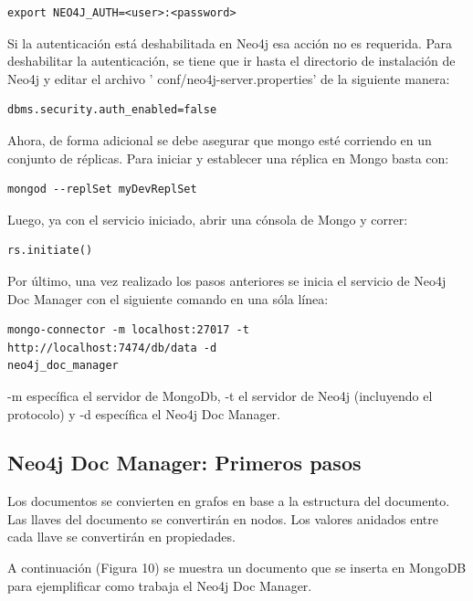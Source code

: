\documentclass[conference]{IEEEtran}
\begin{document}
\begin{lstlisting}
export NEO4J_AUTH=<user>:<password>
\end{lstlisting}

Si la autenticaci\'on est\'a deshabilitada en Neo4j esa acci\'on no es requerida. Para deshabilitar la autenticación, se tiene que ir hasta el directorio de instalaci\'on de Neo4j y editar el archivo ' conf/neo4j-server.properties'  de la siguiente manera:

\begin{lstlisting}
dbms.security.auth_enabled=false
\end{lstlisting}

Ahora, de forma adicional se debe asegurar que mongo est\'e corriendo en un conjunto de r\'eplicas. Para iniciar y establecer una réplica en Mongo basta con:

\begin{lstlisting}
mongod --replSet myDevReplSet
\end{lstlisting}

Luego, ya con el servicio iniciado, abrir una c\'onsola de Mongo y correr:

\begin{lstlisting}
rs.initiate()
\end{lstlisting}

Por \'ultimo, una vez realizado los pasos anteriores se inicia el servicio de Neo4j Doc Manager con el siguiente comando en una s\'ola l\'inea:

\begin{lstlisting}
mongo-connector -m localhost:27017 -t
http://localhost:7474/db/data -d
neo4j_doc_manager
\end{lstlisting}

-m espec\'ifica el servidor de MongoDb, -t el servidor de Neo4j (incluyendo el protocolo) y -d espec\'ifica el Neo4j Doc Manager.

\subsection*{Neo4j Doc Manager: Primeros pasos}

Los documentos se convierten en grafos en base a la estructura del documento. Las llaves del documento se convertir\'an en nodos. Los valores anidados entre cada llave se convertir\'an en propiedades.

A continuaci\'on (Figura 10) se muestra un documento que se inserta en MongoDB para ejemplificar como trabaja el Neo4j Doc Manager.
\end{document}
